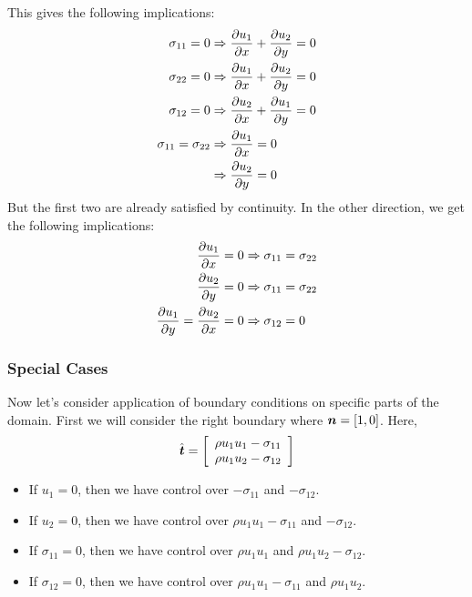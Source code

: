 \documentclass{article}
\begin{document}
This gives the following implications:
\begin{equation*}
\begin{aligned}
\sigma_{11}=0 & \Rightarrow \frac{\partial u_1}{\partial x}+\frac{\partial u_2}{\partial y}=0 \\
\sigma_{22}=0 & \Rightarrow \frac{\partial u_1}{\partial x}+\frac{\partial u_2}{\partial y}=0 \\
\sigma_{12}=0 & \Rightarrow \frac{\partial u_2}{\partial x}+\frac{\partial u_1}{\partial y}=0 \\
\sigma_{11}=\sigma_{22} & \Rightarrow \frac{\partial u_1}{\partial x}=0   \\ 
& \Rightarrow \frac{\partial u_2}{\partial y}=0 \\
\end{aligned}
\end{equation*}
But the first two are already satisfied by continuity.
In the other direction, we get the following implications:
\begin{equation*}
\begin{aligned}
\frac{\partial u_1}{\partial x}=0 & \Rightarrow \sigma_{11}=\sigma_{22} \\
\frac{\partial u_2}{\partial y}=0 & \Rightarrow \sigma_{11}=\sigma_{22} \\
\frac{\partial u_1}{\partial y}=\frac{\partial u_2}{\partial x}=0 & \Rightarrow \sigma_{12}=0 \\
\end{aligned}
\end{equation*}

\subsubsection*{Special Cases}
Now let's consider application of boundary conditions on specific parts of the domain. First we will consider the right boundary where $\boldsymbol n=[1,0]$.
Here,
\begin{equation*}
\hat{\boldsymbol t}=\left[ 
\begin{array}{c}
\rho u_1u_1-\sigma_{11} \\
\rho u_1u_2-\sigma_{12} \\
\end{array}
 \right]
\end{equation*}
\begin{itemize}
  \item If $u_1=0$, then we have control over $-\sigma_{11}$ and $-\sigma_{12}$.
  \item If $u_2=0$, then we have control over $\rho u_1u_1-\sigma_{11}$ and $-\sigma_{12}$.
  \item If $\sigma_{11}=0$, then we have control over $\rho u_1u_1$ and $\rho u_1u_2-\sigma_{12}$.
  \item If $\sigma_{12}=0$, then we have control over $\rho u_1u_1-\sigma_{11}$ and $\rho u_1u_2$.
\end{itemize}
\end{document}
